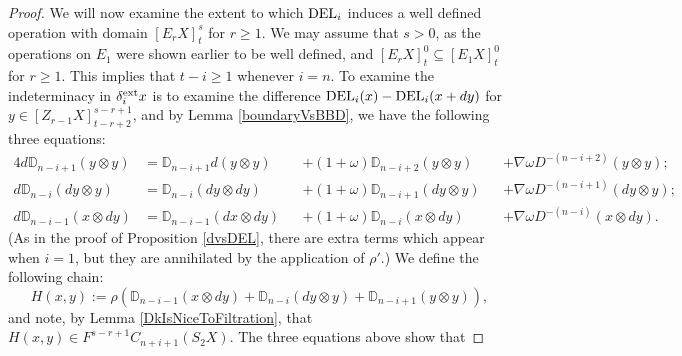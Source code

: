 \documentclass[11pt]{amsart} \renewcommand{\baselinestretch}{1.2}
\theoremstyle{plain}
\numberwithin{equation}{section} %
\theoremstyle{plain}
\numberwithin{equation}{chapter} %
\newcommand{\twist}{\omega}
\newcommand{\Nabla}{\nabla}
\newcommand{\Edownup}[5]{[E_{#1}^{#2}#3]^{#4}_{#5}}
\newcommand{\EZdownup}[5]{[Z^{#2}_{#1}#3]^{#4}_{#5}}
\begin{document}
\begin{second quadrant homotopy sseq operations}
\begin{proof}
We will now examine the extent to which $\textup{DEL}_{i}$ induces a well defined operation with domain $\Edownup{r}{}{X}{s}{t}$ for $r\geq1$. We may assume that $s>0$, as the operations on $E_1$ were shown earlier to be well defined, and $\Edownup{r}{}{X}{0}{t}\subseteq \Edownup{1}{}{X}{0}{t}$ for $r\geq1$.
This implies that $t-i\geq1$ whenever $i=n$. To examine the indeterminacy in $\delta_i^\textup{ext}x$ is to examine the difference $\textup{DEL}_i(x)-\textup{DEL}_i(x+dy)$ for $y\in \EZdownup{r-1}{}{X}{s-r+1}{t-r+2}$, and by Lemma \ref{boundaryVsBBD}, we have the following three equations:
\begin{alignat*}{4}
d\mathbb{D}_{n-i+1}(y\otimes y)&=
\mathbb{D}_{n-i+1}d(y\otimes y)&&+
{(1{+}\twist)\mathbb{D}_{n-i+2}(y\otimes y)}&&+
\Nabla\twist D^{-(n-i+2)}(y\otimes y);\\
d\mathbb{D}_{n-i}(dy\otimes y)&=
\mathbb{D}_{n-i}(dy\otimes dy)&&+
(1{+}\twist)\mathbb{D}_{n-i+1}(dy\otimes y)&&+
\Nabla\twist D^{-(n-i+1)}(dy\otimes y);\\
d\mathbb{D}_{n-i-1}(x\otimes dy)&=
{\mathbb{D}_{n-i-1}(dx\otimes dy)}&&+
(1{+}\twist)\mathbb{D}_{n-i}(x\otimes dy)&&+
\Nabla\twist D^{-(n-i)}(x\otimes dy).
\end{alignat*}
(As in the proof of Proposition \ref{dvsDEL}, there are extra terms which appear when $i=1$, but they are annihilated by the application of $\rho'$.)
We define the following chain:
\[H(x,y):=\rho(\mathbb{D}_{n-i-1}(x\otimes dy)+\mathbb{D}_{n-i}(dy\otimes y)+\mathbb{D}_{n-i+1}(y\otimes y)),\]
and note,  by Lemma \ref{DkIsNiceToFiltration}, that $H(x,y)\in F^{s-r+1}C_{n+i+1}(S_2X)$. %
The three equations above show that%

\end{proof}
\end{second quadrant homotopy sseq operations}
\end{document}
